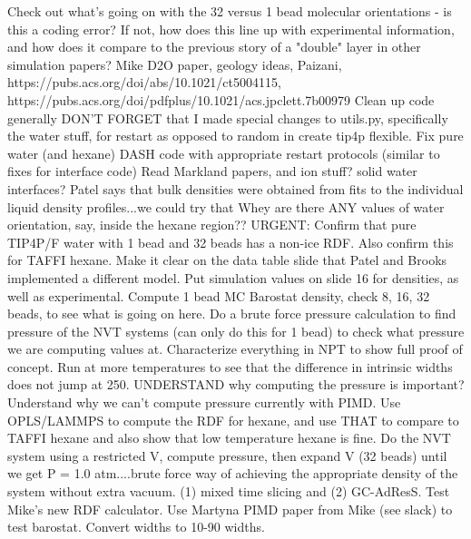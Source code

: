 \documentclass[12pt,reqno]{amsart}
\numberwithin{equation}{section}
\begin{document}
\begin{enumerate}
\subitem Check out what's going on with the 32 versus 1 bead molecular orientations - is this a coding error?  If not, how does this line up with experimental information, and how does it compare to the previous story of a "double" layer in other simulation papers?  
\subitem Mike D2O paper, geology ideas, Paizani, https://pubs.acs.org/doi/abs/10.1021/ct5004115, https://pubs.acs.org/doi/pdfplus/10.1021/acs.jpclett.7b00979
\subitem Clean up code generally 
\subitem DON'T FORGET that I made special changes to utils.py, specifically the water stuff, for restart as opposed to random in create tip4p flexible.  
\subitem Fix pure water (and hexane) DASH code with appropriate restart protocols (similar to fixes for interface code)
\subitem Read Markland papers, and ion stuff?  solid water interfaces?
\subitem Patel says that bulk densities were obtained from fits to the individual liquid density profiles...we could try that
\subitem Whey are there ANY values of water orientation, say, inside the hexane region??
\subitem URGENT: Confirm that pure TIP4P/F water with 1 bead and 32 beads has a non-ice RDF.  Also confirm this for TAFFI hexane.  Make it clear on the data table slide that Patel and Brooks implemented a different model.  Put simulation values on slide 16 for densities, as well as experimental.  Compute 1 bead MC Barostat density, check 8, 16, 32 beads, to see what is going on here.  Do a brute force pressure calculation to find pressure of the NVT systems (can only do this for 1 bead) to check what pressure we are computing values at.  Characterize everything in NPT to show full proof of concept.  Run at more temperatures to see that the difference in intrinsic widths does not jump at 250.  UNDERSTAND why computing the pressure is important?  Understand why we can't compute pressure currently with PIMD.  Use OPLS/LAMMPS to compute the RDF for hexane, and use THAT to compare to TAFFI hexane and also show that low temperature hexane is fine.  Do the NVT system using a restricted V, compute pressure, then expand V (32 beads) until we get P = 1.0 atm....brute force way of achieving the appropriate density of the system without extra vacuum.  (1) mixed time slicing and (2) GC-AdResS.  Test Mike's new RDF calculator.  Use Martyna PIMD paper from Mike (see slack) to test barostat.  Convert widths to 10-90 widths.  


\end{enumerate}
\end{document}
